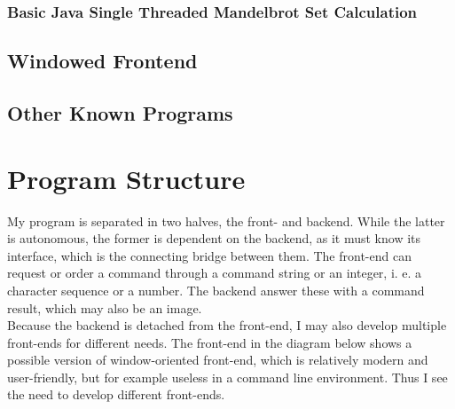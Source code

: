 \documentclass[10pt,a4paper,titlepage]{article}
\begin{document}
	\subsubsection{Basic Java Single Threaded Mandelbrot Set Calculation}
	\subsection{Windowed Frontend}
	\subsection{Other Known Programs}
	
	\section{Program Structure}
	
	
	My program is separated in two halves, the front- and backend. While the latter is autonomous, the former is dependent on the backend, as it must know its interface, which is the connecting bridge between them. The front-end can request or order a command through a command string or an integer, i. e. a character sequence or a number. The backend answer these with a command result, which may also be an image.\\
	Because the backend is detached from the front-end, I may also develop multiple front-ends for different needs. The front-end in the diagram below shows a possible version of window-oriented front-end, which is relatively modern and user-friendly, but for example useless in a command line environment. Thus I see the need to develop different front-ends.
	
\end{document}
